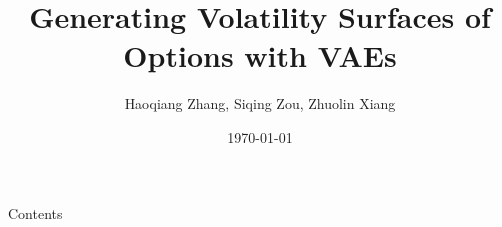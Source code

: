 \documentclass{beamer}
\title{Generating Volatility Surfaces of Options with VAEs}
\author{Haoqiang Zhang, Siqing Zou, Zhuolin Xiang}
\date{\today}
\newcommand\todo{\textcolor{red}{\textbf{TODO}}}
\begin{document}
\maketitle

\begin{frame}{Contents}
    \tableofcontents
\end{frame}



\end{document}
